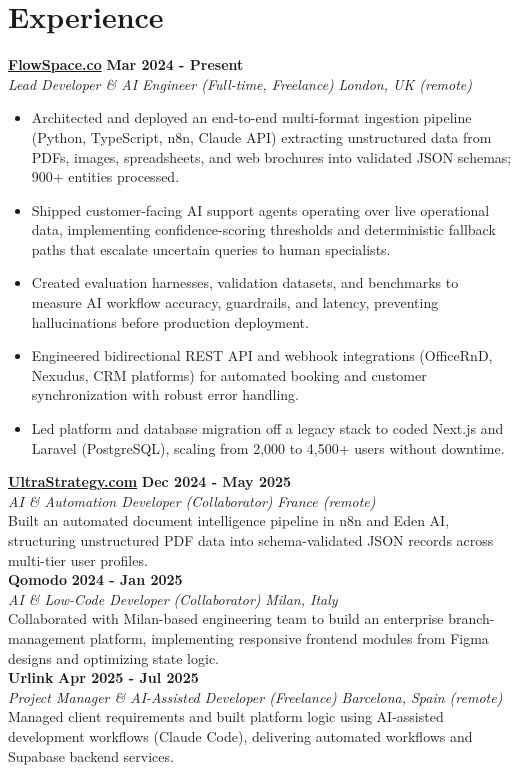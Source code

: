 \documentclass[a4paper,10pt]{article}
\newcommand{\role}[4]{%
  \textbf{#1} \hfill \textbf{#2}\\[1pt]%
  \textit{#3} \hfill \textit{#4}\\[2pt]%
}
\begin{document}
\section{Experience}

\role{\href{https://flowspace.co}{FlowSpace.co}}{Mar 2024 - Present}{Lead Developer \& AI Engineer (Full-time, Freelance)}{London, UK (remote)}
\begin{itemize}
  \item Architected and deployed an end-to-end multi-format ingestion pipeline (Python, TypeScript, n8n, Claude API) extracting unstructured data from PDFs, images, spreadsheets, and web brochures into validated JSON schemas; 900+ entities processed.
  \item Shipped customer-facing AI support agents operating over live operational data, implementing confidence-scoring thresholds and deterministic fallback paths that escalate uncertain queries to human specialists.
  \item Created evaluation harnesses, validation datasets, and benchmarks to measure AI workflow accuracy, guardrails, and latency, preventing hallucinations before production deployment.
  \item Engineered bidirectional REST API and webhook integrations (OfficeRnD, Nexudus, CRM platforms) for automated booking and customer synchronization with robust error handling.
  \item Led platform and database migration off a legacy stack to coded Next.js and Laravel (PostgreSQL), scaling from 2,000 to 4,500+ users without downtime.
\end{itemize}

\role{\href{https://ultrastrategy.com}{UltraStrategy.com}}{Dec 2024 - May 2025}{AI \& Automation Developer (Collaborator)}{France (remote)}
Built an automated document intelligence pipeline in n8n and Eden AI, structuring unstructured PDF data into schema-validated JSON records across multi-tier user profiles.\\[1pt]

\role{Qomodo}{2024 - Jan 2025}{AI \& Low-Code Developer (Collaborator)}{Milan, Italy}
Collaborated with Milan-based engineering team to build an enterprise branch-management platform, implementing responsive frontend modules from Figma designs and optimizing state logic.\\[1pt]

\role{Urlink}{Apr 2025 - Jul 2025}{Project Manager \& AI-Assisted Developer (Freelance)}{Barcelona, Spain (remote)}
Managed client requirements and built platform logic using AI-assisted development workflows (Claude Code), delivering automated workflows and Supabase backend services.\\[1pt]
\end{document}
